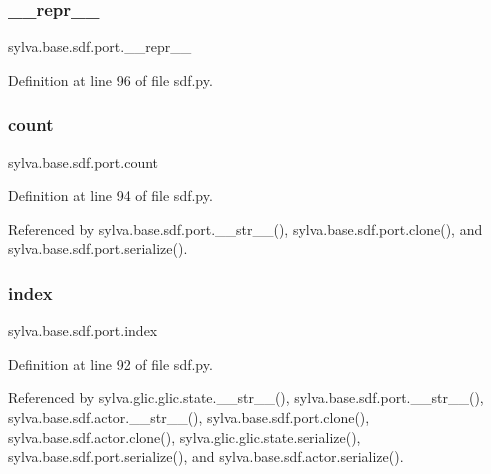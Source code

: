 \subsubsection{\texorpdfstring{\+\_\+\+\_\+repr\+\_\+\+\_\+}{\_\_repr\_\_}}
{\footnotesize\ttfamily sylva.\+base.\+sdf.\+port.\+\_\+\+\_\+repr\+\_\+\+\_\+\hspace{0.3cm}{\ttfamily [private]}}



Definition at line 96 of file sdf.\+py.

\mbox{\label{classsylva_1_1base_1_1sdf_1_1port_a628b66dd64830393bcf8d88b85023016}} 
\subsubsection{\texorpdfstring{count}{count}}
{\footnotesize\ttfamily sylva.\+base.\+sdf.\+port.\+count}



Definition at line 94 of file sdf.\+py.



Referenced by sylva.\+base.\+sdf.\+port.\+\_\+\+\_\+str\+\_\+\+\_\+(), sylva.\+base.\+sdf.\+port.\+clone(), and sylva.\+base.\+sdf.\+port.\+serialize().

\mbox{\label{classsylva_1_1base_1_1sdf_1_1port_a4ed6db96ef0a6fb3d9b8f36c59bf7bdd}} 
\subsubsection{\texorpdfstring{index}{index}}
{\footnotesize\ttfamily sylva.\+base.\+sdf.\+port.\+index}



Definition at line 92 of file sdf.\+py.



Referenced by sylva.\+glic.\+glic.\+state.\+\_\+\+\_\+str\+\_\+\+\_\+(), sylva.\+base.\+sdf.\+port.\+\_\+\+\_\+str\+\_\+\+\_\+(), sylva.\+base.\+sdf.\+actor.\+\_\+\+\_\+str\+\_\+\+\_\+(), sylva.\+base.\+sdf.\+port.\+clone(), sylva.\+base.\+sdf.\+actor.\+clone(), sylva.\+glic.\+glic.\+state.\+serialize(), sylva.\+base.\+sdf.\+port.\+serialize(), and sylva.\+base.\+sdf.\+actor.\+serialize().

